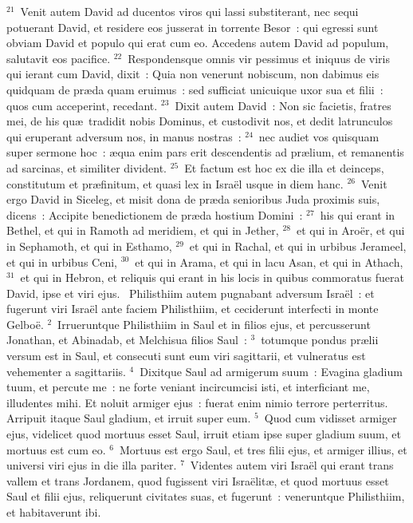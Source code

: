 ${}^{21}$~Venit autem David ad ducentos viros qui lassi substiterant, nec sequi potuerant David, et residere eos jusserat in torrente Besor~: qui egressi sunt obviam David et populo qui erat cum eo. Accedens autem David ad populum, salutavit eos pacifice.
${}^{22}$~Respondensque omnis vir pessimus et iniquus de viris qui ierant cum David, dixit~: Quia non venerunt nobiscum, non dabimus eis quidquam de pr\ae da quam eruimus~: sed sufficiat unicuique uxor sua et filii~: quos cum acceperint, recedant.
${}^{23}$~Dixit autem David~: Non sic facietis, fratres mei, de his qu\ae\ tradidit nobis Dominus, et custodivit nos, et dedit latrunculos qui eruperant adversum nos, in manus nostras~:
${}^{24}$~nec audiet vos quisquam super sermone hoc~: \ae qua enim pars erit descendentis ad pr\ae lium, et remanentis ad sarcinas, et similiter divident.
${}^{25}$~Et factum est hoc ex die illa et deinceps, constitutum et pr\ae finitum, et quasi lex in Isra\"el usque in diem hanc.
${}^{26}$~Venit ergo David in Siceleg, et misit dona de pr\ae da senioribus Juda proximis suis, dicens~: Accipite benedictionem de pr\ae da hostium Domini~:
${}^{27}$~his qui erant in Bethel, et qui in Ramoth ad meridiem, et qui in Jether,
${}^{28}$~et qui in Aro\"er, et qui in Sephamoth, et qui in Esthamo,
${}^{29}$~et qui in Rachal, et qui in urbibus Jerameel, et qui in urbibus Ceni,
${}^{30}$~et qui in Arama, et qui in lacu Asan, et qui in Athach,
${}^{31}$~et qui in Hebron, et reliquis qui erant in his locis in quibus commoratus fuerat David, ipse et viri ejus.
~Philisthiim autem pugnabant adversum Isra\"el~: et fugerunt viri Isra\"el ante faciem Philisthiim, et ceciderunt interfecti in monte Gelbo\"e.
${}^{2}$~Irrueruntque Philisthiim in Saul et in filios ejus, et percusserunt Jonathan, et Abinadab, et Melchisua filios Saul~:
${}^{3}$~totumque pondus pr\ae lii versum est in Saul, et consecuti sunt eum viri sagittarii, et vulneratus est vehementer a sagittariis.
${}^{4}$~Dixitque Saul ad armigerum suum~: Evagina gladium tuum, et percute me~: ne forte veniant incircumcisi isti, et interficiant me, illudentes mihi. Et noluit armiger ejus~: fuerat enim nimio terrore perterritus. Arripuit itaque Saul gladium, et irruit super eum.
${}^{5}$~Quod cum vidisset armiger ejus, videlicet quod mortuus esset Saul, irruit etiam ipse super gladium suum, et mortuus est cum eo.
${}^{6}$~Mortuus est ergo Saul, et tres filii ejus, et armiger illius, et universi viri ejus in die illa pariter.
${}^{7}$~Videntes autem viri Isra\"el qui erant trans vallem et trans Jordanem, quod fugissent viri Isra\"elit\ae , et quod mortuus esset Saul et filii ejus, reliquerunt civitates suas, et fugerunt~: veneruntque Philisthiim, et habitaverunt ibi.
